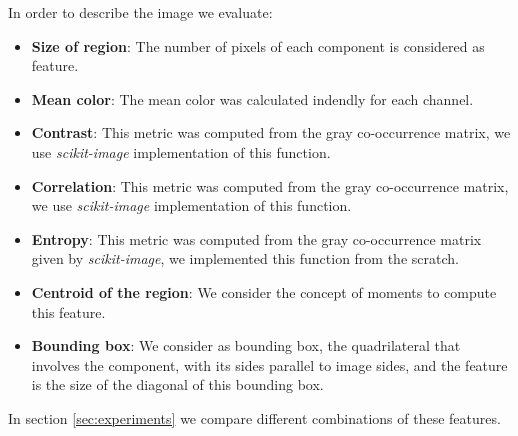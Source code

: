 In order to describe the image we evaluate:

\begin{itemize}
\item \textbf{Size of region}: The number of pixels of each component is considered as feature.
\item \textbf{Mean color}: The mean color was calculated indendly for each channel.
\item \textbf{Contrast}: This metric was computed from the gray co-occurrence matrix, we use \textit{scikit-image} implementation of this function.
\item \textbf{Correlation}: This metric was computed from the gray co-occurrence matrix, we use \textit{scikit-image} implementation of this function.
\item \textbf{Entropy}: This metric was computed from the gray co-occurrence matrix given by \textit{scikit-image}, we implemented this function from the scratch.
\item \textbf{Centroid of the region}: We consider the concept of moments to compute this feature.
\item \textbf{Bounding box}: We consider as bounding box, the quadrilateral that involves the component, with its sides parallel to image sides, and the feature is the size of the diagonal of this bounding box.
\end{itemize}

In section \ref{sec:experiments} we compare different combinations of these features.



